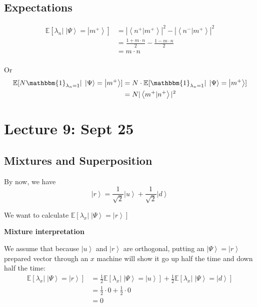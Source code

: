 \documentclass[12pt]{article}
\newcommand{\brak}[1]{\left\langle #1 \right\rangle}
\newcommand{\ket}[1]{\left\vert #1 \right\rangle}
\newcommand{\E}{\mathbb{E}}
\newcommand{\ind}{\mathbbm{1}}
\begin{document}
\begin{center}
\end{center}

\subsection*{Expectations}
\begin{align*}
    \E[\lambda_n |\; \ket{\Psi} = \ket{m^+}] &= |\brak{n^+ | m^+}|^2 - |\brak{n^- | m^+}|^2\\
    &= \frac{1 + m\cdot n}{2} - \frac{1 - m\cdot n}{2}\\
    &= m\cdot n\\
\end{align*}

Or 
\begin{align*}
    \E[N \ind_{\lambda_n = 1} |\; \ket{\Psi} = \ket{m^+}] &= N \cdot \E[\ind_{\lambda_n = 1} | \; \ket{\Psi} = \ket{m^+}]\\
    &= N |\brak{m^+ | n^+}|^2
\end{align*}

\section*{Lecture 9: Sept 25}
\subsection*{Mixtures and Superposition}
By now, we have 
\[\ket r = \frac{1}{\sqrt 2} \ket u + \frac{1}{\sqrt 2} \ket d\]

We want to calculate $\E[\lambda_x | \; \ket \Psi = \ket r]$

\textbf{Mixture interpretation}

We assume that because $\ket u$ and $\ket r$ are orthogonal, putting an $\ket \Psi = \ket r$ prepared vector through an $x$ machine will show it go up half the time and down half the time:
\begin{align*}
    \E[\lambda_x | \; \ket \Psi= \ket r] &= \frac{1}{2}\E[\lambda_x | \; \ket{\Psi} = \ket{u}] + \frac{1}{2}\E[\lambda_x | \; \ket{\Psi} = \ket{d}]\\
    &= \frac{1}{2}\cdot 0 + \frac{1}{2}\cdot 0\\
    &= 0
\end{align*}
\end{document}
